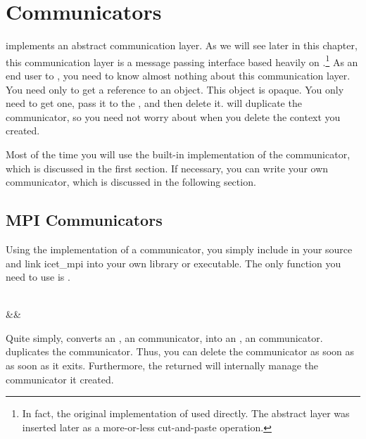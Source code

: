 

\chapter{Communicators}
\label{chap:Communicators}

\IceT implements an abstract communication layer.  As we will see later in
this chapter, this communication layer is a message passing interface based
heavily on \MPI.\footnote{In fact, the original implementation of \IceT
  used \MPI directly.  The abstract layer was inserted later as a
  more-or-less cut-and-paste operation.}  As an end user to \IceT, you need
to know almost nothing about this communication layer.  You need only to
get a reference to an  object.  This object is
opaque.  You only need to get one, pass it to the
, and then delete it.
 will duplicate the communicator, so you need not
worry about when you delete the context you created.

Most of the time you will use the built-in \MPI implementation of the
communicator, which is discussed in the first section.  If necessary, you
can write your own communicator, which is discussed in the following section.

\section{MPI Communicators}
\label{sec:Communicators:MPI_Communicators}

Using the \MPI implementation of a communicator, you simply include
 in your
source and link icet\_mpi into your
own library or executable.  The only function you need to use is
.

\begin{Table}{3}
  \\
  \makebox[3.5in]{}&&\quad\textC{);}
\end{Table}

Quite simply,  converts an
, an \MPI communicator, into an ,
an \IceT communicator.   duplicates the
\MPI communicator.  Thus, you can delete the  communicator
as soon as  as soon as it exits.
Furthermore, the returned  will internally manage
the \MPI communicator it created.


